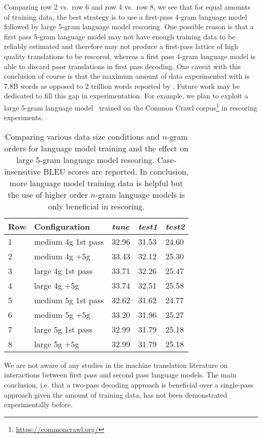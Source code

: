 Comparing row 2 vs.\ row 6 and row 4 vs.\ row 8, we see
that for equal amounts of training data, the best strategy
is to use a first-pass 4-gram language model followed by
large 5-gram language model rescoring. One possible reason
is that a first pass 5-gram language model may not have enough training
data to be reliably estimated and therefore may not
produce a first-pass lattice of high quality translations to be rescored, whereas
a first pass 4-gram language model is able to discard poor translations in first pass
decoding.
One caveat with this
conclusion of course is that the maximum amount of data experimented
with is 7.8B words as opposed to 2 trillion words reported
by \citet{brants-popat-xu-och-dean:2007:EMNLP-CoNLL}. Future work may be dedicated to fill this gap in experimentation.
For example, we plan to exploit a large 5-gram language model~\citep{buck-heafield-vanooyen:2014:LREC}
trained on the Common Crawl corpus\footnote{\url{https://commoncrawl.org/}}
in rescoring experiments.
%
\begin{table}
  \begin{center}
    \begin{tabular}{l|l|lll}
      Row & Configuration & \emph{tune} & \emph{test1} & \emph{test2} \\
      \hline
      1 & medium 4g 1st pass & 32.96 & 31.53 & 24.60 \\
      2 & medium 4g +5g &       33.43 & 32.12 & 25.30 \\
      \hline
      3 & large 4g 1st pass  & 33.71 & 32.26 & 25.47 \\
      4 & large 4g +5g       & 33.74 & 32.51 & 25.58 \\
      \hline
      5 & medium 5g 1st pass & 32.62 & 31.62 & 24.77 \\
      6 & medium 5g +5g       & 33.20 & 31.96 & 25.27 \\
      \hline
      7 & large 5g 1st pass  & 32.99 & 31.79 & 25.18 \\
      8 & large 5g +5g       & 32.99 & 31.79 & 25.18 \\
    \end{tabular}
    \caption{Comparing various data size conditions and $n$-gram orders
      for language model training and the effect on large 5-gram language
      model rescoring. Case-insensitive BLEU scores are reported.
      In conclusion, more language
      model training data is helpful but the use of higher order $n$-gram language
      models is only beneficial in rescoring.}
    \label{tab:lmSizes}
  \end{center}
\end{table}
%
We are not aware of any studies in the machine translation literature on
interactions between first pass and second pass language models.
The main conclusion, i.e. that a two-pass decoding approach is beneficial over a single-pass
approach given the amount of training data, has not been demonstrated experimentally before.

